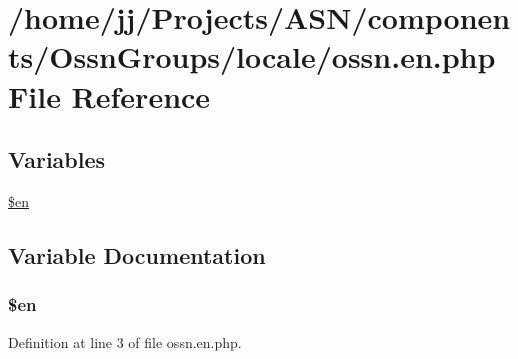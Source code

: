\hypertarget{components_2_ossn_groups_2locale_2ossn_8en_8php}{}\section{/home/jj/\+Projects/\+A\+S\+N/components/\+Ossn\+Groups/locale/ossn.en.\+php File Reference}
\label{components_2_ossn_groups_2locale_2ossn_8en_8php}
\subsection*{Variables}
\begin{DoxyCompactItemize}
\item 
\hyperlink{components_2_ossn_groups_2locale_2ossn_8en_8php_a48abc714dfb71c8fffa83cf49f452115}{\$en}
\end{DoxyCompactItemize}


\subsection{Variable Documentation}
\subsubsection[{\texorpdfstring{\$en}{$en}}]{\setlength{\rightskip}{0pt plus 5cm}\$en}\hypertarget{components_2_ossn_groups_2locale_2ossn_8en_8php_a48abc714dfb71c8fffa83cf49f452115}{}\label{components_2_ossn_groups_2locale_2ossn_8en_8php_a48abc714dfb71c8fffa83cf49f452115}


Definition at line 3 of file ossn.\+en.\+php.


